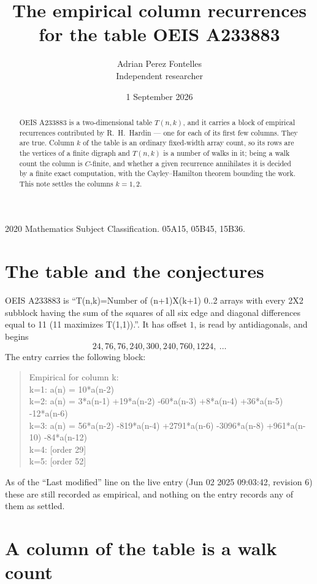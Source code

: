 \documentclass[11pt,a4paper]{article}
\title{The empirical column recurrences for the table OEIS A233883}
\author{Adrian Perez Fontelles\\ \small Independent researcher}
\date{1 September 2026}
\theoremstyle{plain}
\theoremstyle{definition}
\begin{document}
\maketitle

\begin{abstract}
OEIS A233883 is a two-dimensional table $T(n,k)$, and it carries a block of empirical
recurrences contributed by R.~H.~Hardin --- one for each of its first few columns. They are
true. Column $k$ of the table is an ordinary fixed-width array count, so its rows are the
vertices of a finite digraph and $T(n,k)$ is a number of walks in it; being a walk count the
column is $C$-finite, and whether a given recurrence annihilates it is decided by a finite
exact computation, with the Cayley--Hamilton theorem bounding the work. This note settles the columns $k=1, 2$.
\end{abstract}

\noindent\small 2020 Mathematics Subject Classification. 05A15, 05B45, 15B36.\normalsize

\section{The table and the conjectures}

OEIS A233883 is ``T(n,k)=Number of (n+1)X(k+1) 0..2 arrays with every 2X2 subblock having the sum of the squares of all six edge and diagonal differences equal to 11 (11 maximizes T(1,1)).''. It has offset $1$, is
read by antidiagonals, and begins
\[
24, 76, 76, 240, 300, 240, 760, 1224,\ \dots
\]
The entry carries the following block:
\begin{quote}\small
Empirical for column k:\\
k=1: a(n) = 10*a(n-2)\\
k=2: a(n) = 3*a(n-1) +19*a(n-2) -60*a(n-3) +8*a(n-4) +36*a(n-5) -12*a(n-6)\\
k=3: a(n) = 56*a(n-2) -819*a(n-4) +2791*a(n-6) -3096*a(n-8) +961*a(n-10) -84*a(n-12)\\
k=4: [order 29]\\
k=5: [order 52]\\
\end{quote}
As of the ``Last modified'' line on the live entry (Jun 02 2025 09:03:42, revision 6) these are still
recorded as empirical, and nothing on the entry records any of them as settled.

\section{A column of the table is a walk count}
\end{document}

